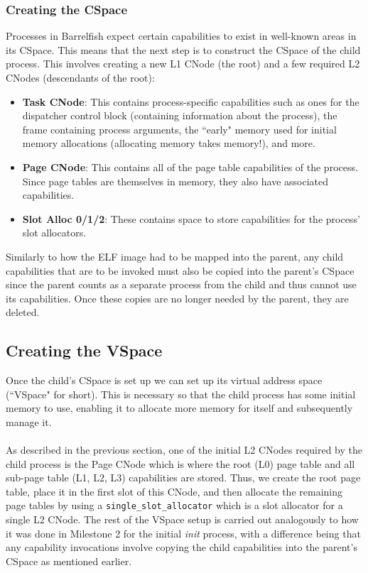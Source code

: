 \subsubsection{Creating the CSpace}
Processes in Barrelfish expect certain capabilities to exist in well-known areas in its CSpace. This means that the next step is to construct the CSpace of the child process. This involves creating a new L1 CNode (the root) and a few required L2 CNodes (descendants of the root):
\begin{itemize}[itemsep=0pt]
    \item \textbf{Task CNode}: This contains process-specific capabilities such as ones for the dispatcher control block (containing information about the process), the frame containing process arguments, the ``early" memory used for initial memory allocations (allocating memory takes memory!), and more.
    \item \textbf{Page CNode}: This contains all of the page table capabilities of the process. Since page tables are themselves in memory, they also have associated capabilities.
    \item \textbf{Slot Alloc 0/1/2}: These contains space to store capabilities for the process' slot allocators.
\end{itemize}
Similarly to how the ELF image had to be mapped into the parent, any child capabilities that are to be invoked must also be copied into the parent's CSpace since the parent counts as a separate process from the child and thus cannot use its capabilities. Once these copies are no longer needed by the parent, they are deleted.

\subsection{Creating the VSpace}\label{m3-2}
Once the child's CSpace is set up we can set up its virtual address space (``VSpace" for short). This is necessary so that the child process has some initial memory to use, enabling it to allocate more memory for itself and subsequently manage it.
\\\\
As described in the previous section, one of the initial L2 CNodes required by the child process is the Page CNode which is where the root (L0) page table and all sub-page table (L1, L2, L3) capabilities are stored. Thus, we create the root page table, place it in the first slot of this CNode, and then allocate the remaining page tables by using a \texttt{single\_slot\_allocator} which is a slot allocator for a single L2 CNode. The rest of the VSpace setup is carried out analogously to how it was done in Milestone 2 for the initial \textit{init} process, with a difference being that any capability invocations involve copying the child capabilities into the parent's CSpace as mentioned earlier.

